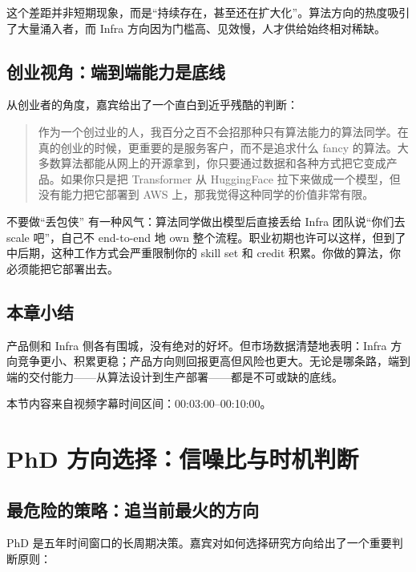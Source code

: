\documentclass[a4paper]{article}
\begin{document}
这个差距并非短期现象，而是``持续存在，甚至还在扩大化''。算法方向的热度吸引了大量涌入者，而 Infra 方向因为门槛高、见效慢，人才供给始终相对稀缺。

\subsection{创业视角：端到端能力是底线}

从创业者的角度，嘉宾给出了一个直白到近乎残酷的判断：

\begin{quote}
作为一个创过业的人，我百分之百不会招那种只有算法能力的算法同学。在真的创业的时候，更重要的是服务客户，而不是追求什么 fancy 的算法。大多数算法都能从网上的开源拿到，你只要通过数据和各种方式把它变成产品。如果你只是把 Transformer 从 HuggingFace 拉下来做成一个模型，但没有能力把它部署到 AWS 上，那我觉得这种同学的价值非常有限。
\end{quote}

\begin{warningbox}{不要做``丢包侠''}
有一种风气：算法同学做出模型后直接丢给 Infra 团队说``你们去 scale 吧''，自己不 end-to-end 地 own 整个流程。职业初期也许可以这样，但到了中后期，这种工作方式会严重限制你的 skill set 和 credit 积累。你做的算法，你必须能把它部署出去。
\end{warningbox}

\subsection{本章小结}

产品侧和 Infra 侧各有围城，没有绝对的好坏。但市场数据清楚地表明：Infra 方向竞争更小、积累更稳；产品方向则回报更高但风险也更大。无论是哪条路，端到端的交付能力——从算法设计到生产部署——都是不可或缺的底线。

\vspace{1em}
\noindent 本节内容来自视频字幕时间区间：00:03:00--00:10:00。


\section{PhD 方向选择：信噪比与时机判断}

\subsection{最危险的策略：追当前最火的方向}

PhD 是五年时间窗口的长周期决策。嘉宾对如何选择研究方向给出了一个重要判断原则：
\end{document}
